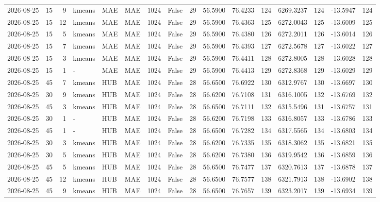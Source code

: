 \documentclass[10pt]{article}
\begin{document}
\begin{landscape}
\begin{longtable}{@{}lrrlllrcrrrrrrrr@{}}
2026-08-25 & 15 & 9 & kmeans & MAE & MAE & 1024 & False & 29 & 56.5900 & 76.4233 & 124 & 6269.3237 & 124 & -13.5947 & 124 \\
2026-08-25 & 15 & 12 & kmeans & MAE & MAE & 1024 & False & 29 & 56.5900 & 76.4363 & 125 & 6272.0043 & 125 & -13.6009 & 125 \\
2026-08-25 & 15 & 5 & kmeans & MAE & MAE & 1024 & False & 29 & 56.5900 & 76.4380 & 126 & 6272.2011 & 126 & -13.6014 & 126 \\
2026-08-25 & 15 & 7 & kmeans & MAE & MAE & 1024 & False & 29 & 56.5900 & 76.4393 & 127 & 6272.5678 & 127 & -13.6022 & 127 \\
2026-08-25 & 15 & 3 & kmeans & MAE & MAE & 1024 & False & 29 & 56.5900 & 76.4411 & 128 & 6272.8005 & 128 & -13.6028 & 128 \\
2026-08-25 & 15 & 1 & - & MAE & MAE & 1024 & False & 29 & 56.5900 & 76.4413 & 129 & 6272.8368 & 129 & -13.6029 & 129 \\
2026-08-25 & 45 & 7 & kmeans & HUB & MAE & 1024 & False & 28 & 56.6500 & 76.6922 & 130 & 6312.9767 & 130 & -13.6697 & 130 \\
2026-08-25 & 30 & 9 & kmeans & HUB & MAE & 1024 & False & 28 & 56.6200 & 76.7108 & 131 & 6316.1005 & 132 & -13.6769 & 132 \\
2026-08-25 & 45 & 3 & kmeans & HUB & MAE & 1024 & False & 28 & 56.6500 & 76.7111 & 132 & 6315.5496 & 131 & -13.6757 & 131 \\
2026-08-25 & 30 & 1 & - & HUB & MAE & 1024 & False & 28 & 56.6200 & 76.7198 & 133 & 6316.8057 & 133 & -13.6786 & 133 \\
2026-08-25 & 45 & 1 & - & HUB & MAE & 1024 & False & 28 & 56.6500 & 76.7282 & 134 & 6317.5565 & 134 & -13.6803 & 134 \\
2026-08-25 & 30 & 3 & kmeans & HUB & MAE & 1024 & False & 28 & 56.6200 & 76.7335 & 135 & 6318.3062 & 135 & -13.6821 & 135 \\
2026-08-25 & 30 & 5 & kmeans & HUB & MAE & 1024 & False & 28 & 56.6200 & 76.7380 & 136 & 6319.9542 & 136 & -13.6859 & 136 \\
2026-08-25 & 45 & 5 & kmeans & HUB & MAE & 1024 & False & 28 & 56.6500 & 76.7477 & 137 & 6320.7613 & 137 & -13.6878 & 137 \\
2026-08-25 & 45 & 12 & kmeans & HUB & MAE & 1024 & False & 28 & 56.6500 & 76.7577 & 138 & 6321.7913 & 138 & -13.6902 & 138 \\
2026-08-25 & 45 & 9 & kmeans & HUB & MAE & 1024 & False & 28 & 56.6500 & 76.7657 & 139 & 6323.2017 & 139 & -13.6934 & 139 \\

\end{longtable}
\end{landscape}
\end{document}
